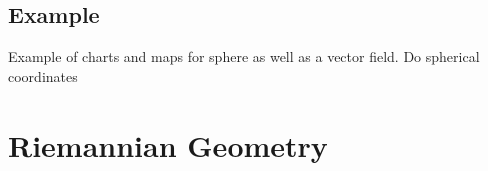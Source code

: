 \documentclass[UKenglish]{beamer}
\begin{document}
\begin{frame}{}
\vfill
\begin{figure}[H]
	\centering
	\def\svgwidth{0.75\columnwidth}
	
\end{figure}
\vfill
\end{frame}

\begin{frame}{}
\vfill
\begin{figure}[H]
	\centering
	\def\svgwidth{\columnwidth}
	
\end{figure}
\vfill
\end{frame}

\begin{frame}{}
\vfill
\begin{figure}[H]
	\centering
	\def\svgwidth{.75\columnwidth}
	
\end{figure}
\vfill
\end{frame}

\begin{frame}{}
\vfill
\begin{figure}[H]
	\centering
	\def\svgwidth{\columnwidth}
	
\end{figure}
\vfill
\end{frame}

\begin{frame}{}
\vfill
\begin{figure}[H]
	\centering
	\def\svgwidth{\columnwidth}
	
\end{figure}
\vfill
\end{frame}

\subsection{Example}

\begin{frame}{}
	Example of charts and maps for sphere as well as a vector field.  Do spherical coordinates
\end{frame}

\begin{frame}{}
\vfill
\begin{figure}[H]
	\centering
	\def\svgwidth{\columnwidth}
	
\end{figure}
\vfill
\end{frame}

\section{Riemannian Geometry}
\end{document}
